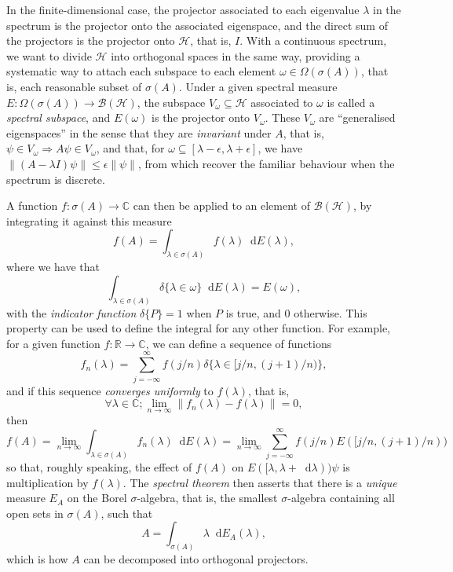 \documentclass[10pt, a4paper]{article}
\numberwithin{equation}{section} %
\theoremstyle{definition}
\theoremstyle{plain}
\newcommand{\norm}[1]{\left\lVert#1\right\rVert}
\newcommand{\dif}{\mathop{}\!\mathrm{d}} %
\newcommand{\?}{\mathrel{?}} %
\newcommand{\R}{\mathbb{R}} %
\newcommand{\C}{\mathbb{C}} %
\newcommand{\Hs}{\mathcal{H}} %
\begin{document}
\begin{appendices}
      In the finite-dimensional case, the projector associated to each eigenvalue \(\lambda\) in the spectrum is the projector onto the associated eigenspace, and the direct sum of the projectors is the projector onto \(\Hs\), that is, \(I\). With a continuous spectrum, we want to divide \(\Hs\) into orthogonal spaces in the same way, providing a systematic way to attach each subspace to each element \(\omega \in \Omega(\sigma(A))\), that is, each reasonable subset of \(\sigma(A)\). Under a given spectral measure \(E : \Omega(\sigma(A)) \to \mathcal{B}(\Hs)\), the subspace \(V_{\omega} \subseteq \Hs\) associated to \(\omega\) is called a \emph{spectral subspace}, and \(E(\omega)\) is the projector onto \(V_{\omega}\). These \(V_{\omega}\) are ``generalised eigenspaces'' in the sense that they are \emph{invariant} under \(A\), that is, \(\psi \in V_{\omega} \Rightarrow A\psi \in V_{\omega}\), and that, for \(\omega \subseteq [\lambda - \epsilon, \lambda + \epsilon]\), we have \(\norm{(A - \lambda I)\psi} \leq \epsilon\norm{\psi}\), from which recover the familiar behaviour when the spectrum is discrete.

      A function \(f : \sigma(A) \to \C\) can then be applied to an element of \(\mathcal{B}(\Hs)\), by integrating it against this measure
      \[ f(A) = \int_{\lambda \in \sigma(A)} f(\lambda) \dif{E(\lambda)}, \]
      where we have that
      \[ \int_{\lambda \in \sigma(A)} \delta\{\lambda \in \omega\} \dif{E(\lambda)} = E(\omega), \]
      with the \emph{indicator function} \(\delta\{P\} = 1\) when \(P\) is true, and 0 otherwise. This property can be used to define the integral for any other function. For example, for a given function \(f : \R \to \C\), we can define a sequence of functions
      \[ f_n(\lambda) = \sum_{j = -\infty}^{\infty} f(j/n) \delta\{\lambda \in [j/n, (j+1)/n)\}, \]
      and if this sequence \emph{converges uniformly} to \(f(\lambda)\), that is,
      \[ \forall \lambda \in \C; \lim_{n \to \infty} \norm{f_n(\lambda) - f(\lambda)} = 0, \]
      then
      \[ f(A) = \lim_{n\to\infty} \int_{\lambda \in \sigma(A)} f_n(\lambda) \dif{E(\lambda)} = \lim_{n\to\infty} \sum_{j = -\infty}^{\infty} f(j/n) E([j/n, (j+1)/n)) \]
      so that, roughly speaking, the effect of \(f(A)\) on \(E([\lambda, \lambda+\dif{\lambda}))\psi\) is multiplication by \(f(\lambda)\). The \emph{spectral theorem} then asserts that there is a \emph{unique} measure \(E_A\) on the Borel \(\sigma\)-algebra, that is, the smallest \(\sigma\)-algebra containing all open sets in \(\sigma(A)\), such that
      \[ A = \int_{\sigma(A)} \lambda \dif{E_A(\lambda)}, \]
      which is how \(A\) can be decomposed into orthogonal projectors.


\end{appendices}
\end{document}

